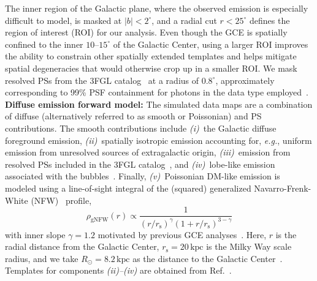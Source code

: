 \documentclass[prd,aps,10pt,nofootinbib,twocolumn,superscriptaddress,preprintnumbers,balancelastpage,longbibliography]{revtex4-1}
\begin{document}
The inner region of the Galactic plane, where the observed emission is especially difficult to model, is masked at $|b| < 2^\circ$, and a radial cut $r < 25^\circ$ defines the region of interest (ROI) for our analysis. Even though the GCE is spatially confined to the inner $10\mbox{--}15^\circ$ of the Galactic Center, using a larger ROI improves the ability to constrain other spatially extended templates and helps mitigate spatial degeneracies that would otherwise crop up in a smaller ROI. We mask resolved PSs from the 3FGL catalog~\cite{Fermi-LAT:2015bhf} at a radius of $0.8^\circ$, approximately corresponding to 99\% PSF containment for photons in the data type employed~\cite{Fermi-LAT:2015bhf}. \\

\noindent
\textbf{Diffuse emission forward model:} The simulated data maps are a combination of diffuse (alternatively referred to as smooth or Poissonian) and PS contributions. The smooth contributions include \emph{(i)}~the Galactic diffuse foreground emission, \emph{(ii)}~spatially isotropic emission accounting for, \emph{e.g.}, uniform emission from unresolved sources of extragalactic origin, \emph{(iii)}~emission from resolved PSs included in the \Fermi 3FGL catalog~\cite{Fermi-LAT:2015bhf}, and \emph{(iv)}~lobe-like emission associated with the \Fermi bubbles~\cite{Su:2010qj}. Finally, \emph{(v)}~Poissonian DM-like emission is modeled using a line-of-sight integral of the (squared) generalized Navarro-Frenk-White (NFW)~\cite{Navarro:1995iw,Navarro:1996gj} profile,
\begin{equation}
\label{eq:nfw}
\rho_\mathrm{gNFW}(r) \propto \frac{1}{\left(r / r_{\mathrm s}\right)^{\gamma}\left(1+r / r_{\mathrm s}\right)^{3-\gamma}}
\end{equation}
with inner slope $\gamma=1.2$ motivated by previous GCE analyses~\cite{Gordon:2013vta,Daylan:2014rsa,Zhou:2014lva}. Here, $r$ is the radial distance from the Galactic Center, $r_{\mathrm s}=20\,\mathrm{kpc}$ is the Milky Way scale radius, and we take $R_\odot = 8.2\,\mathrm{kpc}$ as the distance to the Galactic Center~\cite{2020arXiv201202169B,2019A&A...625L..10G}. Templates for components \emph{(ii)--(iv)} are obtained from Ref.~\cite{Mishra-Sharma:2016gis}. 
\end{document}
